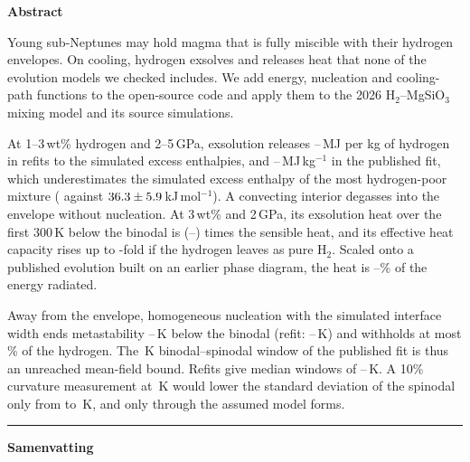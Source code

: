 \begin{center}\bfseries Abstract\end{center}
\begin{narrowtext}
Young sub-Neptunes may hold magma that is fully miscible with their hydrogen envelopes. On
cooling, hydrogen exsolves and releases heat that none of the evolution models we checked
includes. We add energy, nucleation and cooling-path functions to the
open-source code \Atm{} and apply them to the 2026 H$_2$--MgSiO$_3$ mixing model and its
source simulations.\par
\vspace{3pt}
At 1--3\,wt\% hydrogen and 2--5\,GPa, exsolution releases \hbarMOneLo{}--\hbarMOneHi{}\,MJ per
kg of hydrogen in refits to the simulated excess enthalpies, and
\hbarPubLo{}--\hbarPubHi{}\,MJ\,kg$^{-1}$ in the published fit, which underestimates the
simulated excess enthalpy of the most hydrogen-poor mixture (\edHexPub{} against
$36.3\pm5.9$\,kJ\,mol$^{-1}$). A convecting interior degasses into the
envelope without nucleation. At 3\,wt\% and 2\,GPa, its exsolution heat over the first 300\,K
below the binodal is \intRatioThree{} (\intRatioThreeLo{}--\intRatioThreeHi{}) times the
sensible heat, and its effective heat capacity rises up to \intCeffThree{}-fold if the hydrogen
leaves as pure H$_2$. Scaled onto a published evolution built on an earlier phase diagram, the
heat is \planetRadiatedLo{}--\planetRadiatedHi{}\% of the energy radiated.\par
\vspace{3pt}
Away from the envelope, homogeneous nucleation with the simulated interface width ends
metastability \dlyFigOneCPubLo{}--\dlyFigOneCPubHi{}\,K below the binodal (refit:
\dlyFigOneCMOneLo{}--\dlyFigOneCMOneHi{}\,K) and withholds at most \whFigOneCPubHi{}\% of the
hydrogen. The \pubIntTwo{}\,K binodal--spinodal window of the published fit is thus an
unreached mean-field bound. Refits give median windows of \IntRangeLo{}--\IntRangeHi{}\,K. A
10\% curvature measurement at \curvT{}\,K would lower the standard deviation of the spinodal
only from \designSdNow{} to \curvSdPooled{}\,K, and only through the assumed model forms.
\end{narrowtext}
\vspace{10pt}
\noindent\rule{\textwidth}{0.6pt}
\vspace{10pt}
\begin{center}\bfseries Samenvatting\end{center}
